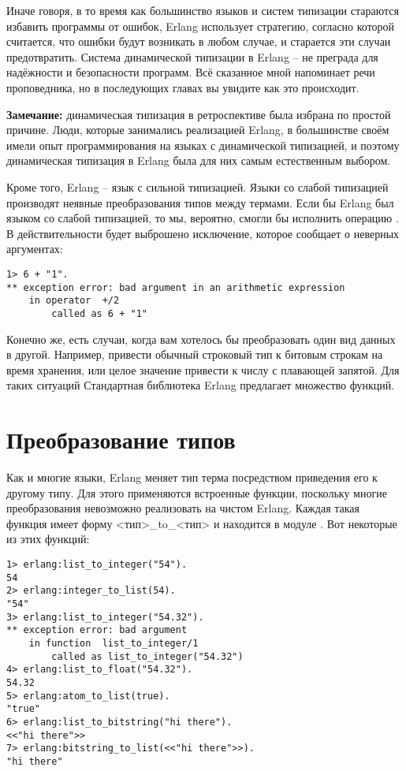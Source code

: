 Иначе говоря, в то время как большинство языков и систем типизации стараются избавить программы от ошибок, Erlang использует стратегию, согласно которой считается, что ошибки будут возникать в любом случае, и старается эти случаи предотвратить.
Система динамической типизации в Erlang \--- не преграда для надёжности и безопасности программ.
Всё сказанное мной напоминает речи проповедника, но в последующих главах вы увидите как это происходит.\\
\colorbox{lgray}
{
    \begin{minipage}{\linewidth}
\textbf{Замечание:} динамическая типизация в ретроспективе была избрана по простой причине.
Люди, которые занимались реализацией Erlang, в большинстве своём имели опыт программирования на языках с динамической типизацией, и поэтому динамическая типизация в Erlang была для них самым естественным выбором.
    \end{minipage}
}

Кроме того, Erlang \--- язык с сильной типизацией.
Языки со слабой типизацией производят неявные преобразования типов между термами.
Если бы Erlang был языком со слабой типизацией, то мы, вероятно, смогли бы исполнить операцию .
В действительности будет выброшено исключение, которое сообщает о неверных аргументах:
\begin{lstlisting}[style=erlang]
1> 6 + "1".
** exception error: bad argument in an arithmetic expression
    in operator  +/2
        called as 6 + "1"
\end{lstlisting}

Конечно же, есть случаи, когда вам хотелось бы преобразовать один вид данных в другой.
Например, привести обычный строковый тип к битовым строкам на время хранения, или целое значение привести к числу с плавающей запятой.
Для таких ситуаций Стандартная библиотека Erlang предлагает множество функций.
\section{Преобразование типов}
Как и многие языки, Erlang меняет тип терма посредством приведения его к другому типу.
Для этого применяются встроенные функции, поскольку многие преобразования невозможно реализовать на чистом Erlang.
Каждая такая функция имеет форму <тип>\_to\_<тип> и находится в модуле .
Вот некоторые из этих функций:
\begin{lstlisting}[style=erlang]
1> erlang:list_to_integer("54").
54
2> erlang:integer_to_list(54).
"54"
3> erlang:list_to_integer("54.32").
** exception error: bad argument
    in function  list_to_integer/1
        called as list_to_integer("54.32")
4> erlang:list_to_float("54.32").
54.32
5> erlang:atom_to_list(true).
"true"
6> erlang:list_to_bitstring("hi there").
<<"hi there">>
7> erlang:bitstring_to_list(<<"hi there">>).
"hi there"
\end{lstlisting}

